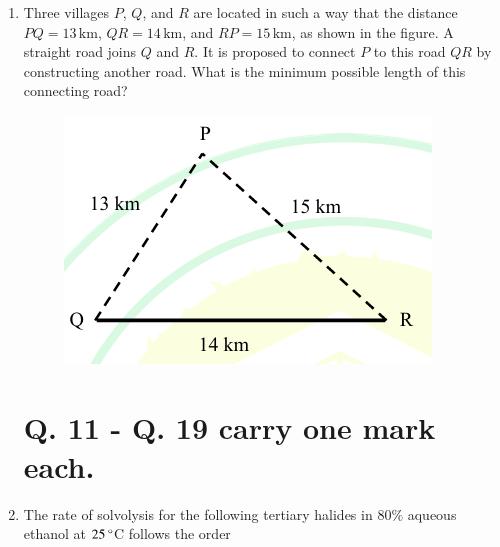 \documentclass[journal]{IEEEtran}
\begin{document}
\begin{enumerate}
    \item Three villages $P$, $Q$, and $R$ are located in such a way that the distance $PQ = 13\,\text{km}$, $QR = 14\,\text{km}$, and $RP = 15\,\text{km}$, as shown in the figure. A straight road joins $Q$ and $R$. It is proposed to connect $P$ to this road $QR$ by constructing another road. What is the minimum possible length  of this connecting road?

    \begin{figure}[H]
        \centering
        \includegraphics[width=0.8\columnwidth]{figs/q10.png}
        \caption*{}
        \label{fig:q10}
    \end{figure}

    \hfill{}

    \begin{enumerate}
    \end{enumerate}

\section*{Q. 11 - Q. 19 carry one mark each.}

    \item The rate of solvolysis for the following tertiary halides in $80\%$ aqueous ethanol at $25\,\degree$C follows the order


\end{enumerate}
\end{document}
